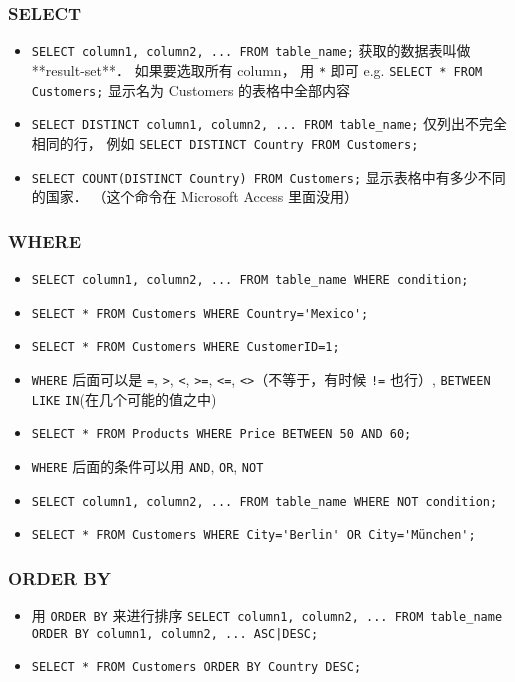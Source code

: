 \subsubsection{SELECT}
\begin{itemize}
\item \verb`SELECT column1, column2, ... FROM table_name;` 获取的数据表叫做 **result-set**． 如果要选取所有 column， 用 \verb`*` 即可 e.g. \verb`SELECT * FROM Customers;` 显示名为 Customers 的表格中全部内容
\item \verb`SELECT DISTINCT column1, column2, ... FROM table_name;` 仅列出不完全相同的行， 例如 \verb`SELECT DISTINCT Country FROM Customers;`
\item \verb`SELECT COUNT(DISTINCT Country) FROM Customers;` 显示表格中有多少不同的国家． （这个命令在 Microsoft Access 里面没用）
\end{itemize}

\subsubsection{WHERE}
\begin{itemize}
\item \verb`SELECT column1, column2, ... FROM table_name WHERE condition;`
\item \verb`SELECT * FROM Customers WHERE Country='Mexico';`
\item \verb`SELECT * FROM Customers WHERE CustomerID=1;`
\item \verb`WHERE` 后面可以是 \verb`=`, \verb`>`, \verb`<`, \verb`>=`, \verb`<=`, \verb`<>`（不等于，有时候 \verb`!=` 也行）, \verb`BETWEEN` \verb`LIKE` \verb`IN`(在几个可能的值之中)
\item \verb`SELECT * FROM Products WHERE Price BETWEEN 50 AND 60;`
\item \verb`WHERE` 后面的条件可以用 \verb`AND`, \verb`OR`, \verb`NOT`
\item \verb`SELECT column1, column2, ... FROM table_name WHERE NOT condition;`
\item \verb`SELECT * FROM Customers WHERE City='Berlin' OR City='München';`
\end{itemize}

\subsubsection{ORDER BY}
\begin{itemize}
\item 用 \verb`ORDER BY` 来进行排序 \verb`SELECT column1, column2, ... FROM table_name ORDER BY column1, column2, ... ASC|DESC;`
\item \verb`SELECT * FROM Customers ORDER BY Country DESC;`
\end{itemize}

